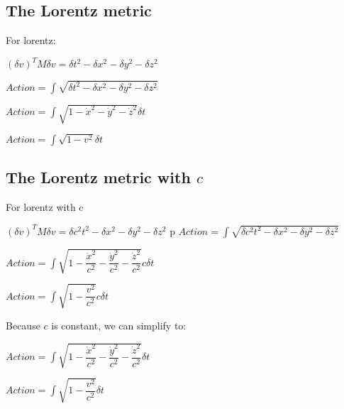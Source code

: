 
\subsection{The Lorentz metric}

For lorentz:

\((\delta v )^TM\delta v = \delta t ^ 2 - \delta x^2-\delta y^2 - \delta z^2\)

\(Action = \int \sqrt {\delta t ^ 2 - \delta x^2-\delta y^2 - \delta z^2}\)

\(Action = \int \sqrt {1 - \dot x^2-\dot y^2 - \dot z^2}\delta t\)

\(Action = \int \sqrt {1-v^2}\delta t\)

\subsection{The Lorentz metric with \(c\)}

For lorentz with c

\((\delta v )^TM\delta v = \delta c^2t ^ 2 - \delta x^2-\delta y^2 - \delta z^2\)
	p \(Action = \int \sqrt {\delta c^2 t ^ 2 - \delta x^2-\delta y^2 - \delta z^2}\)

\(Action = \int \sqrt {1 - \dfrac{\dot x^2}{c^2}-\dfrac{\dot y^2}{c^2} - \dfrac{\dot z^2}{c^2}}c\delta t\)

\(Action = \int \sqrt {1 - \dfrac{v^2}{c^2}}c\delta t\)

Because \(c\) is constant, we can simplify to:

\(Action = \int \sqrt {1 - \dfrac{\dot x^2}{c^2}-\dfrac{\dot y^2}{c^2} - \dfrac{\dot z^2}{c^2}}\delta t\)

\(Action = \int \sqrt {1 - \dfrac{v^2}{c^2}}\delta t\)

